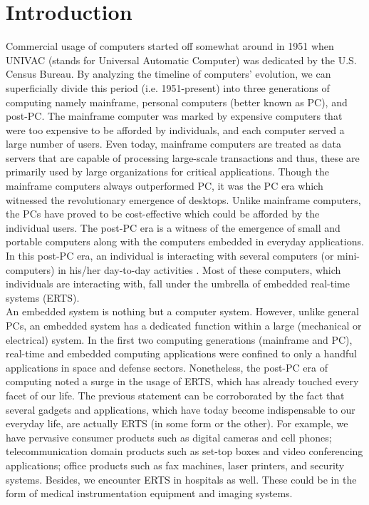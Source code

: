 \documentclass[12pt]{report}
\begin{document}
\chapter{Introduction}
Commercial usage of computers started off somewhat around in 1951 when UNIVAC (stands for Universal Automatic Computer) was dedicated by the U.S. Census Bureau. By analyzing the timeline of computers' evolution, we can superficially divide this period (i.e. 1951-present) into three generations of computing namely mainframe, personal computers (better known as PC), and post-PC. The mainframe computer was marked by expensive computers that were too expensive to be afforded by individuals, and each computer served a large number of users. Even today, mainframe computers are treated as data servers that are capable of processing large-scale transactions and thus, these are primarily used by large organizations for critical applications. Though the mainframe computers always outperformed PC, it was the PC era which witnessed the revolutionary emergence of desktops. Unlike mainframe computers, the PCs have proved to be cost-effective which could be afforded by the individual users. %
The post-PC era is a witness of the emergence of small and portable computers along with the computers embedded in everyday applications. In this post-PC era, an individual is interacting with several computers (or mini-computers) in his/her day-to-day activities  \cite{NPTEL}. Most of these computers, which individuals are interacting with, fall under the umbrella of embedded real-time systems (ERTS). \\

An embedded system is nothing but a computer system. However, unlike general PCs, an embedded system has a dedicated function within a large (mechanical or electrical) system. In the first two computing generations (mainframe and PC), real-time and embedded computing applications were confined to only a handful applications in space and defense sectors. Nonetheless, the post-PC era of computing noted a surge in the usage of ERTS, which has already touched every facet of our life. The previous statement can be corroborated by the fact that several gadgets and applications, which have today become indispensable to our everyday life, are actually ERTS (in some form or the other). For example, we have pervasive consumer products such as digital cameras and cell phones; telecommunication domain products such as set-top boxes and video conferencing applications; office products such as fax machines, laser printers, and security systems. Besides, we encounter ERTS in hospitals as well. These could be in the form of medical instrumentation equipment and imaging systems. \\
\end{document}
